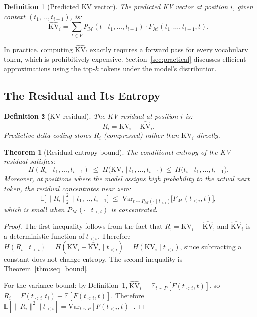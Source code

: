 \documentclass[11pt]{article}
\newtheorem{definition}{Definition}
\newtheorem{theorem}{Theorem}
\begin{document}
\begin{definition}[Predicted KV vector]
\label{def:predicted_kv}
The \emph{predicted KV vector} at position $i$, given context $(t_1,\ldots,t_{i-1})$, is:
\[
  \widehat{\mathrm{KV}}_i = \sum_{t \in V} P_{\mathcal{M}}(t \mid t_1,\ldots,t_{i-1}) \cdot F_{\mathcal{M}}(t_1,\ldots,t_{i-1},t).
\]
\end{definition}

In practice, computing $\widehat{\mathrm{KV}}_i$ exactly requires a forward pass
for every vocabulary token, which is prohibitively expensive.  Section~\ref{sec:practical}
discusses efficient approximations using the top-$k$ tokens under the model's
distribution.

\subsection{The Residual and Its Entropy}

\begin{definition}[KV residual]
\label{def:residual}
The \emph{KV residual} at position $i$ is:
\[
  R_i = \mathrm{KV}_i - \widehat{\mathrm{KV}}_i.
\]
Predictive delta coding stores $R_i$ (compressed) rather than $\mathrm{KV}_i$ directly.
\end{definition}

\begin{theorem}[Residual entropy bound]
\label{thm:residual}
The conditional entropy of the KV residual satisfies:
\[
  H(R_i \mid t_1,\ldots,t_{i-1})
  \;\leq\;
  H\bigl(\mathrm{KV}_i \mid t_1,\ldots,t_{i-1}\bigr)
  \;\leq\;
  H\bigl(t_i \mid t_1,\ldots,t_{i-1}\bigr).
\]
Moreover, at positions where the model assigns high probability to the actual
next token, the residual concentrates near zero:
\[
  \mathbb{E}\bigl[\|R_i\|_2^2 \mid t_1,\ldots,t_{i-1}\bigr]
  \;\leq\;
  \mathrm{Var}_{t \sim P_{\mathcal{M}}(\cdot \mid t_{<i})}\bigl[F_{\mathcal{M}}(t_{<i}, t)\bigr],
\]
which is small when $P_{\mathcal{M}}(\cdot \mid t_{<i})$ is concentrated.
\end{theorem}

\begin{proof}
The first inequality follows from the fact that $R_i = \mathrm{KV}_i - \widehat{\mathrm{KV}}_i$
and $\widehat{\mathrm{KV}}_i$ is a deterministic function of $t_{<i}$.
Therefore $H(R_i \mid t_{<i}) = H(\mathrm{KV}_i - \widehat{\mathrm{KV}}_i \mid t_{<i}) = H(\mathrm{KV}_i \mid t_{<i})$,
since subtracting a constant does not change entropy.  The second inequality is
Theorem~\ref{thm:seq_bound}.

For the variance bound: by Definition~\ref{def:predicted_kv},
$\widehat{\mathrm{KV}}_i = \mathbb{E}_{t \sim P}[F(t_{<i}, t)]$, so
$R_i = F(t_{<i}, t_i) - \mathbb{E}[F(t_{<i}, t)]$.
Therefore $\mathbb{E}[\|R_i\|^2 \mid t_{<i}] = \mathrm{Var}_{t \sim P}[F(t_{<i},t)]$.
\end{proof}
\end{document}
